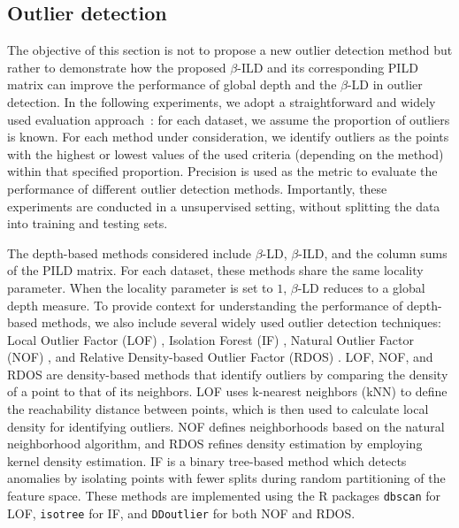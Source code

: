 \documentclass[final,3p,times]{elsarticle}
\begin{document}
\subsection{Outlier detection}
The objective of this section is not to propose a new outlier detection method but rather to demonstrate how the proposed $\beta$-ILD and its corresponding PILD matrix can improve the performance of  global depth and the $\beta$-LD in outlier detection. In the following experiments, we adopt a straightforward and widely used evaluation approach~\cite{campos2016evaluation}: for each dataset, we assume the proportion of outliers is known. For each method under consideration, we identify outliers as the points with the highest or lowest values of the used criteria (depending on the method) within that specified proportion. Precision is used as the metric to evaluate the performance of different outlier detection methods. Importantly, these experiments are conducted in a unsupervised setting, without splitting the data into training and testing sets.

The depth-based methods considered include $\beta$-LD, $\beta$-ILD, and the column sums of the PILD matrix. For each dataset, these methods share the same locality parameter. When the locality parameter is set to $1$, $\beta$-LD reduces to a global depth measure. To provide context for understanding the performance of depth-based methods, we also include several widely used outlier detection techniques: Local Outlier Factor (LOF) \cite{breunig2000lof}, Isolation Forest (IF) \cite{liu2008isolation}, Natural Outlier Factor (NOF) \cite{huang2016non}, and Relative Density-based Outlier Factor (RDOS) \cite{tang2017local}. LOF, NOF, and RDOS are density-based methods that identify outliers by comparing the density of a point to that of its neighbors.  LOF uses k-nearest neighbors (kNN) to define the reachability distance between points, which is then used to calculate local density for identifying outliers. NOF defines neighborhoods based on the natural neighborhood algorithm, and RDOS refines density estimation by employing kernel density estimation. IF is a binary tree-based method which detects anomalies by isolating points with fewer splits during random partitioning of the feature space. These methods are implemented using the R packages \texttt{dbscan} \cite{dbscan2024} for LOF, \texttt{isotree} \cite{isotree2024} for IF, and \texttt{DDoutlier} \cite{DDout2018} for both NOF and RDOS.
\end{document}
